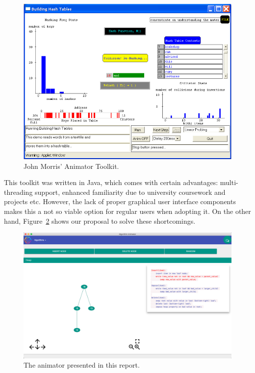 \documentclass{l4proj}
\begin{document}
\begin{figure}[!ht]
\centering
\includegraphics[scale=0.8]{animator-toolkit}
\caption{John Morris' Animator Toolkit.}
\label{fig:animator-toolkit}
\end{figure}

This toolkit was written in Java, which comes with certain advantages: multi-threading support, enhanced familiarity due to
university coursework and projects etc. However, the lack of proper graphical user interface components makes this a
not so viable option for regular users when adopting it. On the other hand, Figure~\ref{fig:palgo} shows our proposal to solve these shortcomings.

\begin{figure}[!ht]
\centering
\includegraphics[scale=0.3]{algo-animator}
\caption{The animator presented in this report.}
\label{fig:palgo}
\end{figure}
\end{document}

